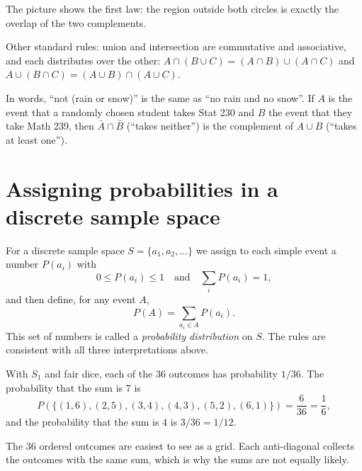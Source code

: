 The picture shows the first law: the region outside both circles is exactly the overlap
of the two complements.

Other standard rules: union and intersection are commutative and associative, and each
distributes over the other:
$A \cap (B \cup C) = (A\cap B)\cup(A \cap C)$ and $A \cup (B\cap C) = (A\cup B)\cap(A\cup C)$.

\begin{example}
In words, ``not (rain or snow)'' is the same as ``no rain and no snow''. If $A$ is the event
that a randomly chosen student takes Stat 230 and $B$ the event that they take Math 239,
then $\bar A \cap \bar B$ (``takes neither'') is the complement of $A \cup B$ (``takes at
least one'').
\end{example}

\section{Assigning probabilities in a discrete sample space}

For a discrete sample space $S = \{a_1, a_2, \dots\}$ we assign to each simple event a
number $P(a_i)$ with
\[
  0 \le P(a_i) \le 1 \quad\text{and}\quad \sum_{i} P(a_i) = 1,
\]
and then define, for any event $A$,
\[
  P(A) = \sum_{a_i \in A} P(a_i).
\]
This set of numbers is called a \emph{probability distribution} on $S$. The rules are
consistent with all three interpretations above.

\begin{example}
With $S_1$ and fair dice, each of the $36$ outcomes has probability $1/36$. The
probability that the sum is $7$ is
\[
  P(\{(1,6),(2,5),(3,4),(4,3),(5,2),(6,1)\}) = \frac{6}{36} = \frac16,
\]
and the probability that the sum is $4$ is $3/36 = 1/12$.
\end{example}

The $36$ ordered outcomes are easiest to see as a grid. Each anti-diagonal collects the
outcomes with the same sum, which is why the sums are not equally likely.

\begin{center}
\end{center}


